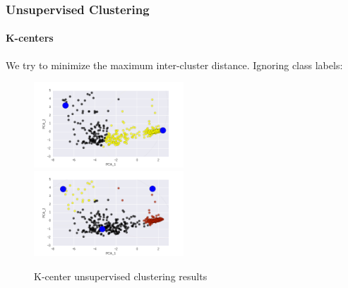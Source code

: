 \documentclass[10pt]{beamer}
\begin{document}
  \begin{frame}
    \frametitle{Unsupervised Clustering}
    \framesubtitle{K-centers}
    We try to minimize the maximum inter-cluster distance.
    Ignoring class labels:
    \begin{figure}
    \centering
    \includegraphics[width=0.5\textwidth]{m1.png}
    \includegraphics[width=0.5\textwidth]{m2.png}
    \caption{K-center unsupervised clustering results}
    \end{figure}


    \end{frame}
\end{document}
